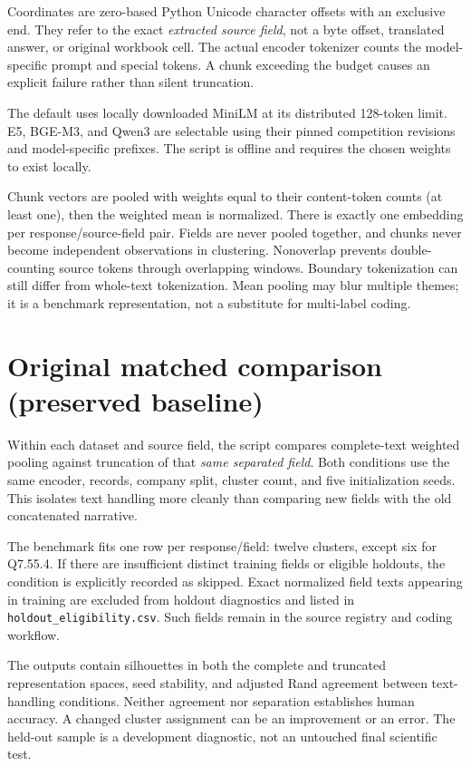 \documentclass[11pt,a4paper]{article}
\begin{document}
Coordinates are zero-based Python Unicode character offsets with an
exclusive end. They refer to the exact \emph{extracted source field},
not a byte offset, translated answer, or original workbook cell.
The actual encoder tokenizer counts the model-specific prompt and special
tokens. A chunk exceeding the budget causes an explicit failure rather
than silent truncation.

The default uses locally downloaded MiniLM at its distributed
128-token limit. E5, BGE-M3, and Qwen3 are selectable using their pinned
competition revisions and model-specific prefixes. The script is offline
and requires the chosen weights to exist locally.

Chunk vectors are pooled with weights equal to their content-token counts
(at least one), then the weighted mean is normalized. There is exactly
one embedding per response/source-field pair. Fields are never pooled
together, and chunks never become independent observations in clustering.
Nonoverlap prevents double-counting source tokens through overlapping
windows. Boundary tokenization can still differ from whole-text tokenization.
Mean pooling may blur multiple themes; it is a benchmark representation,
not a substitute for multi-label coding.

\section{Original matched comparison (preserved baseline)}
Within each dataset and source field, the script compares complete-text
weighted pooling against truncation of that \emph{same separated field}.
Both conditions use the same encoder, records, company split, cluster
count, and five initialization seeds. This isolates text handling more
cleanly than comparing new fields with the old concatenated narrative.

The benchmark fits one row per response/field: twelve clusters, except six
for Q7.55.4. If there are insufficient distinct training fields or eligible
holdouts, the condition is explicitly recorded as skipped. Exact normalized
field texts appearing in training are excluded from holdout diagnostics
and listed in \texttt{holdout\_eligibility.csv}. Such fields remain in
the source registry and coding workflow.

The outputs contain silhouettes in both the complete and truncated
representation spaces, seed stability, and adjusted Rand agreement between
text-handling conditions. Neither agreement nor separation establishes
human accuracy. A changed cluster assignment can be an improvement or an
error. The held-out sample is a development diagnostic, not an untouched
final scientific test.
\end{document}
